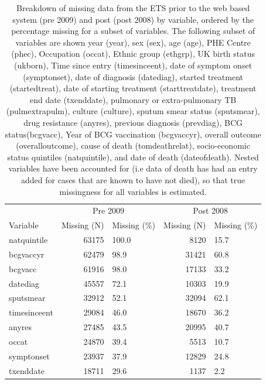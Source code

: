 \documentclass[11pt,twoside]{bristolthesis}
\begin{document}
  \begin{table}[H]
  
  \caption[Breakdown of missing data from the ETS prior to the web based system (pre 2009) and post (post 2008) by variable, ordered by the  percentage missing for a subset of variables.]{\label{tab:missing-var-tabs}Breakdown of missing data from the ETS prior to the web based system (pre 2009) and post (post 2008) by variable, ordered by the  percentage missing for a subset of variables. The following subset of variables are shown year (year), sex (sex), age (age), PHE Centre (phec), Occupation (occat), Ethnic group (ethgrp), UK birth status (ukborn), Time since entry (timesinceent), date of symptom onset (symptonset), date of diagnosis (datediag), started treatment (startedtreat), date of starting treatment (starttreatdate), treatment end date (txenddate), pulmonary or extra-pulmonary TB (pulmextrapulm), culture (culture), sputum smear status (sputsmear), drug resistance (anyres), previous diagnosis (prevdiag), BCG status(bcgvacc), Year of BCG vaccination (bcgvaccyr), overall outcome (overalloutcome), cause of death (tomdeathrelat), socio-economic status quintiles (natquintile), and date of death (dateofdeath). Nested variables have been accounted for (i.e data of death has had an entry added for cases that are known to have not died), so that true missingness for all variables is estimated.}
  \centering
  \begin{tabular}{lrlrl}
  \toprule
  \multicolumn{1}{c}{ } & \multicolumn{2}{c}{Pre 2009} & \multicolumn{2}{c}{Post 2008} \\
  \cmidrule(l{3pt}r{3pt}){2-3} \cmidrule(l{3pt}r{3pt}){4-5}
  Variable & Missing (N) &  Missing (\%) & Missing (N) &  Missing (\%)\\
  \midrule
  natquintile & 63175 & 100.0 & 8120 & 15.7\\
  bcgvaccyr & 62479 & 98.9 & 31421 & 60.8\\
  bcgvacc & 61916 & 98.0 & 17133 & 33.2\\
  datediag & 45557 & 72.1 & 10303 & 19.9\\
  sputsmear & 32912 & 52.1 & 32094 & 62.1\\
  \addlinespace
  timesinceent & 29084 & 46.0 & 18670 & 36.2\\
  anyres & 27485 & 43.5 & 20995 & 40.7\\
  occat & 24870 & 39.4 & 5513 & 10.7\\
  symptonset & 23937 & 37.9 & 12829 & 24.8\\
  txenddate & 18711 & 29.6 & 1137 & 2.2\\

\end{tabular}
\end{table}
\end{document}
